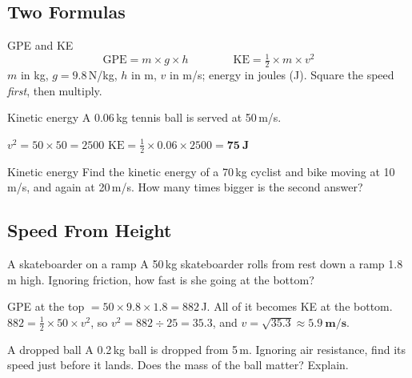 \rcreset
{}

\label{theory:5}

\subsection{Two Formulas}\label{sub:a5.1}

\begin{skillbox}{GPE and KE}
\[ \text{GPE} = m \times g \times h \qquad\qquad \text{KE} = \tfrac{1}{2} \times m \times v^2 \]
$m$ in kg, $g = 9.8$\,N/kg, $h$ in m, $v$ in m/s; energy in joules (J). Square the speed \emph{first}, then multiply.
\end{skillbox}

\begin{workedex}{Kinetic energy}
A 0.06\,kg tennis ball is served at 50\,m/s.

\smallskip
$v^2 = 50 \times 50 = 2500$ \qquad $\text{KE} = \tfrac{1}{2} \times 0.06 \times 2500 = \mathbf{75\ \text{J}}$
\end{workedex}

\begin{wedo}{Kinetic energy}
Find the kinetic energy of a 70\,kg cyclist and bike moving at 10\,m/s, and again at 20\,m/s. How many times bigger is the second answer?
\end{wedo}

\subsection{Speed From Height}\label{sub:a5.2}

\begin{workedex}{A skateboarder on a ramp}
A 50\,kg skateboarder rolls from rest down a ramp 1.8\,m high. Ignoring friction, how fast is she going at the bottom?

\smallskip
GPE at the top $= 50 \times 9.8 \times 1.8 = 882$\,J. All of it becomes KE at the bottom.\\
$882 = \tfrac{1}{2} \times 50 \times v^2$, so $v^2 = 882 \div 25 = 35.3$, and $v = \sqrt{35.3} \approx \mathbf{5.9\ \text{m/s}}$.
\end{workedex}

\begin{wedo}{A dropped ball}
A 0.2\,kg ball is dropped from 5\,m. Ignoring air resistance, find its speed just before it lands. Does the mass of the ball matter? Explain.
\end{wedo}

